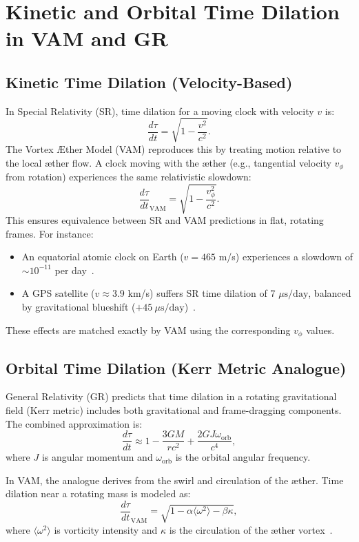 \section{Kinetic and Orbital Time Dilation in VAM and GR}

\subsection{Kinetic Time Dilation (Velocity-Based)}

In Special Relativity (SR), time dilation for a moving clock with velocity $v$ is:
\[
    \frac{d\tau}{dt} = \sqrt{1 - \frac{v^2}{c^2}}.
\]
The Vortex Æther Model (VAM) reproduces this by treating motion relative to the local æther flow. A clock moving with the æther (e.g., tangential velocity $v_\phi$ from rotation) experiences the same relativistic slowdown:
\[
    \frac{d\tau}{dt}_\text{VAM} = \sqrt{1 - \frac{v_\phi^2}{c^2}}.
\]
This ensures equivalence between SR and VAM predictions in flat, rotating frames. For instance:
\begin{itemize}
    \item An equatorial atomic clock on Earth ($v=465$ m/s) experiences a slowdown of $\sim 10^{-11}$ per day~\cite{ashby2003relativity}.
    \item A GPS satellite ($v \approx 3.9$ km/s) suffers SR time dilation of 7 $\mu\text{s}/\text{day}$, balanced by gravitational blueshift ($+45~\mu\text{s}/\text{day}$)~\cite{ashby2003relativity}.
\end{itemize}
These effects are matched exactly by VAM using the corresponding $v_\phi$ values.

\subsection{Orbital Time Dilation (Kerr Metric Analogue)}

General Relativity (GR) predicts that time dilation in a rotating gravitational field (Kerr metric) includes both gravitational and frame-dragging components. The combined approximation is:
\[
    \frac{d\tau}{dt} \approx 1 - \frac{3GM}{rc^2} + \frac{2GJ\omega_\text{orb}}{c^4},
\]
where $J$ is angular momentum and $\omega_\text{orb}$ is the orbital angular frequency.

In VAM, the analogue derives from the swirl and circulation of the æther. Time dilation near a rotating mass is modeled as:
\[
    \frac{d\tau}{dt}_\text{VAM} = \sqrt{1 - \alpha \langle \omega^2 \rangle - \beta \kappa},
\]
where $\langle \omega^2 \rangle$ is vorticity intensity and $\kappa$ is the circulation of the æther vortex~\cite{iskandarani2025VAM2}.

